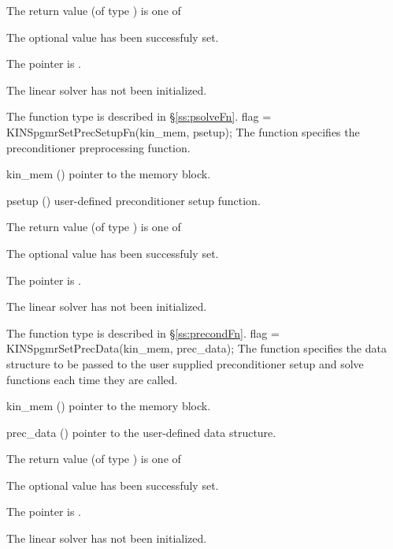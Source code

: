 {
  The return value  (of type ) is one of
  \begin{args}
  \item[\Id{KINSPGMR\_SUCCESS}] 
    The optional value has been successfuly set.
  \item[\Id{KINSPGMR\_MEM\_NULL}]
    The  pointer is .
  \item[\Id{KINSPGMR\_LMEM\_NULL}]
    The {\kinspgmr} linear solver has not been initialized.
  \end{args}
}
{
   The function type  is described in \S\ref{ss:psolveFn}.
}
{
  flag = KINSpgmrSetPrecSetupFn(kin\_mem, psetup);
}
{
  The function  specifies the preconditioner
  preprocessing function.
}
{
  \begin{args}
  \item[kin\_mem] ()
    pointer to the {\kinsol} memory block.
  \item[psetup] ()
    user-defined preconditioner setup function.
  \end{args}
}
{
  The return value  (of type ) is one of
  \begin{args}
  \item[\Id{KINSPGMR\_SUCCESS}] 
    The optional value has been successfuly set.
  \item[\Id{KINSPGMR\_MEM\_NULL}]
    The  pointer is .
  \item[\Id{KINSPGMR\_LMEM\_NULL}]
    The {\kinspgmr} linear solver has not been initialized.
  \end{args}
}
{
   The function type  is described in \S\ref{ss:precondFn}.
}
{
  flag = KINSpgmrSetPrecData(kin\_mem, prec\_data);
}
{
  The function  specifies the data structure
  to be passed to the user supplied preconditioner setup and solve
  functions each time they are called.
}
{
  \begin{args}
  \item[kin\_mem] ()
    pointer to the {\kinsol} memory block.
  \item[prec\_data] ()
     pointer to the user-defined data structure.
  \end{args}
}
{
  The return value  (of type ) is one of
  \begin{args}
  \item[\Id{KINSPGMR\_SUCCESS}] 
    The optional value has been successfuly set.
  \item[\Id{KINSPGMR\_MEM\_NULL}]
    The  pointer is .
  \item[\Id{KINSPGMR\_LMEM\_NULL}]
    The {\kinspgmr} linear solver has not been initialized.
  \end{args}
}
